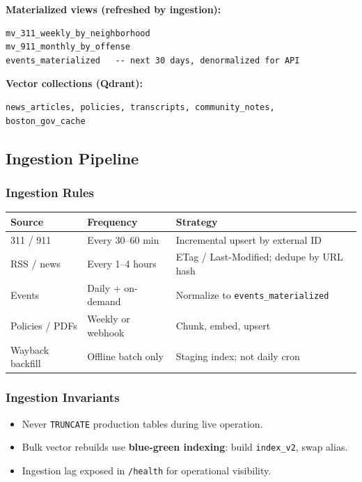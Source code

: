 \documentclass[11pt,a4paper]{article}
\begin{document}
\textbf{Materialized views (refreshed by ingestion):}
\begin{lstlisting}
mv_311_weekly_by_neighborhood
mv_911_monthly_by_offense
events_materialized   -- next 30 days, denormalized for API
\end{lstlisting}

\textbf{Vector collections (Qdrant):}
\begin{lstlisting}
news_articles, policies, transcripts, community_notes, boston_gov_cache
\end{lstlisting}

\subsection{Ingestion Pipeline}

\subsubsection{Ingestion Rules}
\begin{table}[h]
\centering
\small
\begin{tabular}{@{}lll@{}}
\toprule
\textbf{Source} & \textbf{Frequency} & \textbf{Strategy} \\
\midrule
311 / 911 & Every 30--60 min & Incremental upsert by external ID \\
RSS / news & Every 1--4 hours & ETag / Last-Modified; dedupe by URL hash \\
Events & Daily + on-demand & Normalize to \texttt{events\_materialized} \\
Policies / PDFs & Weekly or webhook & Chunk, embed, upsert \\
Wayback backfill & Offline batch only & Staging index; not daily cron \\
\bottomrule
\end{tabular}
\end{table}

\subsubsection{Ingestion Invariants}
\begin{itemize}[noitemsep]
  \item Never \texttt{TRUNCATE} production tables during live operation.
  \item Bulk vector rebuilds use \textbf{blue-green indexing}: build \texttt{index\_v2}, swap alias.
  \item Ingestion lag exposed in \texttt{/health} for operational visibility.
\end{itemize}
\end{document}
